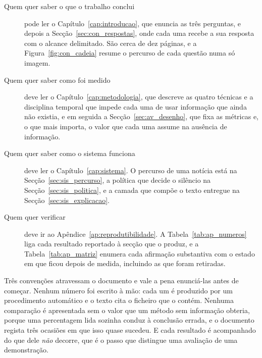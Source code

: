 \begin{description}
  \item[Quem quer saber o que o trabalho conclui] pode ler o Capítulo~\ref{cap:introducao}, que
    enuncia as três perguntas, e depois a Secção~\ref{sec:con_respostas}, onde cada uma recebe a
    sua resposta com o alcance delimitado. São cerca de dez páginas, e a
    Figura~\ref{fig:con_cadeia} resume o percurso de cada questão numa só imagem.

  \item[Quem quer saber como foi medido] deve ler o Capítulo~\ref{cap:metodologia}, que descreve
    as quatro técnicas e a disciplina temporal que impede cada uma de usar informação que ainda
    não existia, e em seguida a Secção~\ref{sec:av_desenho}, que fixa as métricas e, o que mais
    importa, o valor que cada uma assume na ausência de informação.

  \item[Quem quer saber como o sistema funciona] deve ler o Capítulo~\ref{cap:sistema}. O
    percurso de uma notícia está na Secção~\ref{sec:sis_percurso}, a política que decide o
    silêncio na Secção~\ref{sec:sis_politica}, e a camada que compõe o texto entregue na
    Secção~\ref{sec:sis_explicacao}.

  \item[Quem quer verificar] deve ir ao Apêndice~\ref{ap:reprodutibilidade}. A
    Tabela~\ref{tab:ap_numeros} liga cada resultado reportado à secção que o produz, e a
    Tabela~\ref{tab:ap_matriz} enumera cada afirmação substantiva com o estado em que ficou
    depois de medida, incluindo as que foram retiradas.
\end{description}

Três convenções atravessam o documento e vale a pena enunciá-las antes de começar. Nenhum número
foi escrito à mão: cada um é produzido por um procedimento automático e o texto cita o ficheiro
que o contém. Nenhuma comparação é apresentada sem o valor que um método sem informação obteria,
porque uma percentagem lida sozinha conduz à conclusão errada, e o documento regista três ocasiões
em que isso quase sucedeu. E cada resultado é acompanhado do que dele \emph{não} decorre, que é o
passo que distingue uma avaliação de uma demonstração.

